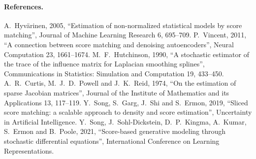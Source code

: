 
\paragraph{References.}
A.~Hyv\"arinen, 2005, ``Estimation of non-normalized statistical models by score
matching'', Journal of Machine Learning Research 6, 695--709.
P.~Vincent, 2011, ``A connection between score matching and denoising autoencoders'',
Neural Computation 23, 1661--1674.
M.~F.~Hutchinson, 1990, ``A stochastic estimator of the trace of the influence matrix
for Laplacian smoothing splines'', Communications in Statistics: Simulation and
Computation 19, 433--450.
A.~R.~Curtis, M.~J.~D.~Powell and J.~K.~Reid, 1974, ``On the estimation of sparse
Jacobian matrices'', Journal of the Institute of Mathematics and its Applications 13,
117--119.
Y.~Song, S.~Garg, J.~Shi and S.~Ermon, 2019, ``Sliced score matching: a scalable
approach to density and score estimation'', Uncertainty in Artificial Intelligence.
Y.~Song, J.~Sohl-Dickstein, D.~P.~Kingma, A.~Kumar, S.~Ermon and B.~Poole, 2021,
``Score-based generative modeling through stochastic differential equations'',
International Conference on Learning Representations.
